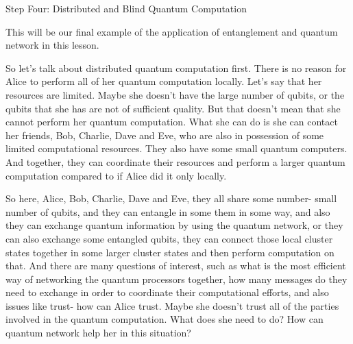Step Four: Distributed and Blind Quantum Computation

This will be our final example of the application of entanglement and quantum network in this lesson.

So let's talk about distributed quantum computation first. There is no reason for Alice to perform all of her quantum computation locally. Let's say that her resources are limited. Maybe she doesn't have the large number of qubits, or the qubits that she has are not of sufficient quality. But that doesn't mean that she cannot perform her quantum computation. What she can do is she can contact her friends, Bob, Charlie, Dave and Eve, who are also in possession of some limited computational resources. They also have some small quantum computers. And together, they can coordinate their resources and perform a larger quantum computation compared to if Alice did it only locally.

So here, Alice, Bob, Charlie, Dave and Eve, they all share some number- small number of qubits, and they can entangle in some them in some way, and also they can exchange quantum information by using the quantum network, or they can also exchange some entangled qubits, they can connect those local cluster states together in some larger cluster states and then perform computation on that. And there are many questions of interest, such as what is the most efficient way of networking the quantum processors together, how many messages do they need to exchange in order to coordinate their computational efforts, and also issues like trust- how can Alice trust. Maybe she doesn't trust all of the parties involved in the quantum computation. What does she need to do? How can quantum network help her in this situation?

